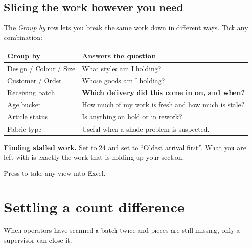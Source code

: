 \subsection{Slicing the work however you need}

The \emph{Group by} row lets you break the same work down in different ways. Tick
any combination:

\begin{table}[H]
\centering
\small
\begin{tabular}{@{}p{34mm}p{104mm}@{}}
\toprule
\textbf{Group by} & \textbf{Answers the question} \\
\midrule
Design / Colour / Size & What styles am I holding? \\
Customer / Order       & Whose goods am I holding? \\
Receiving batch        & \textbf{Which delivery did this come in on, and when?} \\
Age bucket             & How much of my work is fresh and how much is stale? \\
Article status         & Is anything on hold or in rework? \\
Fabric type            & Useful when a shade problem is suspected. \\
\bottomrule
\end{tabular}
\end{table}


\begin{tipbox}
\textbf{Finding stalled work.} Set  to 24 and set
 to ``Oldest arrival first''. What you are left with is exactly
the work that is holding up your section.
\end{tipbox}

Press  to take any view into Excel.

\section{Settling a count difference}

When operators have scanned a batch twice and pieces are still missing, only a
supervisor can close it.


